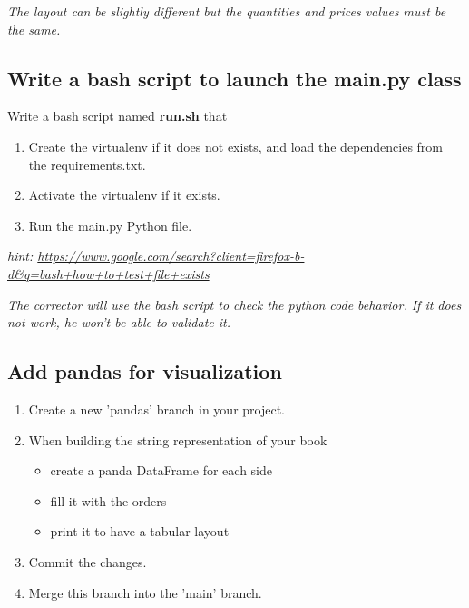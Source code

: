 \textit{The layout can be slightly different but the quantities and prices values must be the same.}

\subsection{Write a bash script to launch the main.py class}

Write a bash script named \textbf{run.sh} that

\begin{enumerate}
    \item Create the virtualenv if it does not exists, and load the dependencies from the requirements.txt.
    \item Activate the virtualenv if it exists.
    \item Run the main.py Python file.
\end{enumerate}

\textit{hint: \url{https://www.google.com/search?client=firefox-b-d&q=bash+how+to+test+file+exists}}

\textit{The corrector will use the bash script to check the python code behavior. If it does not work, he won't be able to validate it.}

\subsection{Add pandas for visualization}

\begin{enumerate}
    \item Create a new 'pandas' branch in your project.
    \item When building the string representation of your book
        \begin{itemize}
            \item create a panda DataFrame for each side
            \item fill it with the orders
            \item print it to have a tabular layout
        \end{itemize}
    \item Commit the changes.
    \item Merge this branch into the 'main' branch.    
\end{enumerate}


